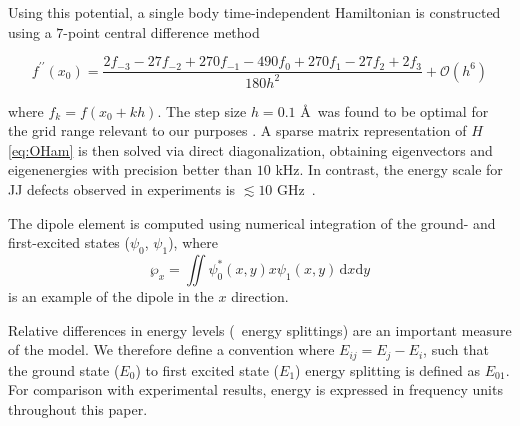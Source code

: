 
Using this potential, a single body time-independent Hamiltonian is constructed using a $7$-point central difference method

\begin{equation}
f^{\prime\prime}(x_0)=\frac{2f_{-3}-27f_{-2}+270f_{-1}-490f_{0}+270f_{1}-27f_{2}+2f_{3}}{180h^{2}}+\mathcal{O}(h^{6})
\end{equation}

where $f_k=f\left(x_0+kh\right)$.
The step size $h=0.1$ \AA\ was found to be optimal for the grid range relevant to our purposes \cite{Mathews2004}.
A sparse matrix representation of $H$ \cref{eq:OHam} is then solved via direct diagonalization, obtaining eigenvectors and eigenenergies with precision better than $10$ kHz. In contrast, the energy scale for JJ defects observed in experiments is $\lesssim 10$ GHz~\cite{Neeley2008, Lupascu2009, Lisenfeld2010}.

The dipole element is computed using numerical integration of the ground- and first-excited states ($\psi_0$, $\psi_1$), where
\begin{equation}
    \wp_x = \iint \psi_0^*(x,y) x \psi_1(x,y) \,\mathrm{d}x\mathrm{d}y
    \label{eq:dipole}
\end{equation}
is an example of the dipole in the $x$ direction.

Relative differences in energy levels (\ie\ energy splittings) are an important measure of the model.
We therefore define a convention where $E_{ij} = E_j-E_i$, such that the ground state ($E_0$) to first excited state ($E_1$) energy splitting is defined as $E_{01}$.
For comparison with experimental results, energy is expressed in frequency units throughout this paper.

